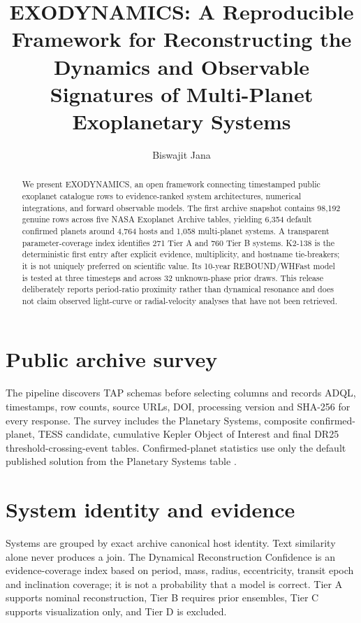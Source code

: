 \documentclass[twocolumn]{aastex631}
\begin{document}
\title{EXODYNAMICS: A Reproducible Framework for Reconstructing the Dynamics and Observable Signatures of Multi-Planet Exoplanetary Systems}
\author{Biswajit Jana}
\begin{abstract}
We present EXODYNAMICS, an open framework connecting timestamped public exoplanet catalogue rows to evidence-ranked system architectures, numerical integrations, and forward observable models. The first archive snapshot contains 98,192 genuine rows across five NASA Exoplanet Archive tables, yielding 6,354 default confirmed planets around 4,764 hosts and 1,058 multi-planet systems. A transparent parameter-coverage index identifies 271 Tier A and 760 Tier B systems. K2-138 is the deterministic first entry after explicit evidence, multiplicity, and hostname tie-breakers; it is not uniquely preferred on scientific value. Its 10-year REBOUND/WHFast model is tested at three timesteps and across 32 unknown-phase prior draws. This release deliberately reports period-ratio proximity rather than dynamical resonance and does not claim observed light-curve or radial-velocity analyses that have not been retrieved.
\end{abstract}

\section{Public archive survey}
The pipeline discovers TAP schemas before selecting columns and records ADQL, timestamps, row counts, source URLs, DOI, processing version and SHA-256 for every response. The survey includes the Planetary Systems, composite confirmed-planet, TESS candidate, cumulative Kepler Object of Interest and final DR25 threshold-crossing-event tables. Confirmed-planet statistics use only the default published solution from the Planetary Systems table \citep{nasa_exoplanet_archive_ps}.

\section{System identity and evidence}
Systems are grouped by exact archive canonical host identity. Text similarity alone never produces a join. The Dynamical Reconstruction Confidence is an evidence-coverage index based on period, mass, radius, eccentricity, transit epoch and inclination coverage; it is not a probability that a model is correct. Tier A supports nominal reconstruction, Tier B requires prior ensembles, Tier C supports visualization only, and Tier D is excluded.
\end{document}
